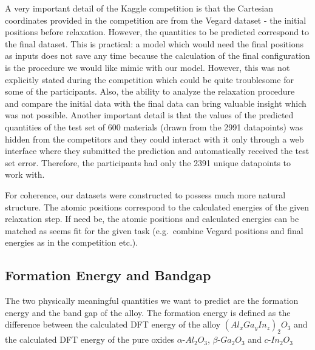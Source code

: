 \documentclass[11pt,oneside,czech,american]{book} %
\theoremstyle{definition} %
\theoremstyle{definition}
\begin{document}
A very important detail of the Kaggle competition is that the Cartesian coordinates provided in the competition are from the Vegard dataset - the initial positions before relaxation. However, the quantities to be predicted correspond to the final dataset. This is practical: a model which would need the final positions as inputs does not save any time because the calculation of the final configuration is the procedure we would like mimic with our model. However, this was not explicitly stated during the competition which could be quite troublesome for some of the participants. Also, the ability to analyze the relaxation procedure and compare the initial data with the final data can bring valuable insight which was not possible. Another important detail is that the values of the predicted quantities of the test set of 600 materials (drawn from the 2991 datapoints) was hidden from the competitors and they could interact with it only through a web interface where they submitted the prediction and automatically received the test set error. Therefore, the participants had only the 2391 unique datapoints to work with.

For coherence, our datasets were constructed to possess much more natural structure. The atomic positions correspond to the calculated energies of the given relaxation step. If need be, the atomic positions and calculated energies can be matched as seems fit for the given task (e.g.\ combine Vegard positions and final energies as in the competition etc.).


\subsection{Formation Energy and Bandgap}
The two physically meaningful quantities we want to predict are the formation energy and the band gap of the alloy. The formation energy is defined as the difference between the calculated DFT energy of the alloy $(Al_{x}Ga_{y}In_{z})_2 O_3$ and the calculated DFT energy of the pure oxides $\alpha$-$Al_2 O_3$, $\beta$-$Ga_2 O_3$ and $c$-$In_2 O_3$
\end{document}
